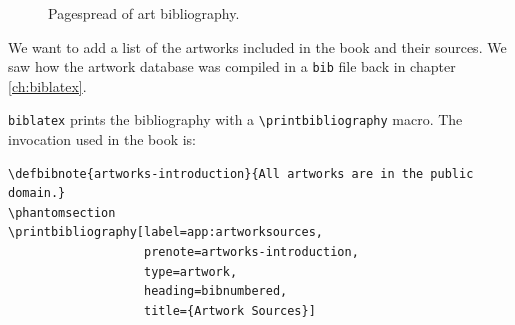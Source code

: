 \documentclass[12pt,a4,oneside,usenames,dvipsnames]{book}
\newcommand\biblatex{\texttt{biblatex}\xspace}%
\begin{document}
\begin{figure}
  \centering
  \qquad\begin{minipage}{0.3\textwidth}%
  \end{minipage}%
  \quad\begin{minipage}{0.3\textwidth}%
  \end{minipage}%
  \caption{\footnotesize{}Pagespread of art bibliography.}
\end{figure}

We want to add a list of the artworks included in the book and their
sources. We saw how the artwork database was compiled in a \texttt{bib}
file back in chapter \hyperref[ch:biblatex]{\ref{ch:biblatex}}.

\biblatex prints the bibliography with a
\texttt{\textbackslash{}printbibliography} macro. The invocation used in
the book is:

\begin{verbatim}
\defbibnote{artworks-introduction}{All artworks are in the public domain.}
\phantomsection
\printbibliography[label=app:artworksources,
                   prenote=artworks-introduction,
                   type=artwork,
                   heading=bibnumbered,
                   title={Artwork Sources}]
\end{verbatim}
\end{document}
